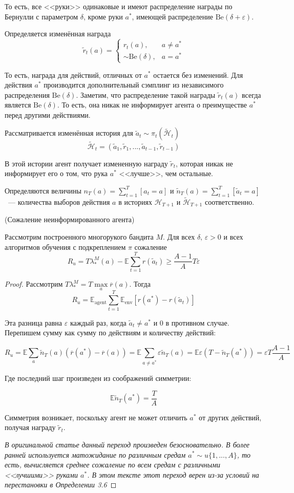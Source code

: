 \documentclass[a4paper]{article}
\newcommand{\Hh}{\mathcal{H}}
\newcommand{\E}{\mathbb{E}}
\newcommand{\Be}{\mbox{Be}}
\def\eps{\varepsilon}
\begin{document}
То есть, все <<руки>> одинаковые и имеют распределение награды по Бернулли с параметром $\delta$, кроме руки $a^*$, имеющей распределение $\Be(\delta+\eps)$.

Определяется изменённая награда
$$\tilde{r}_t(a)=\begin{cases}
r_t(a),&a\neq a^*\\
\sim \Be(\delta),&a=a^*
\end{cases}$$

То есть, награда для действий, отличных от $a^*$ остается без изменений. Для действия $a^*$ производится дополнительный сэмплинг из независимого распределения $\Be(\delta)$. Заметим, что распределение такой награды $\tilde{r}_t(a)$ всегда является $\Be(\delta)$. То есть, она никак не информирует агента о преимуществе $a^*$ перед другими действиями.

Рассматривается изменённая история для $\tilde{a}_t\sim\pi_t(\tilde{\Hh}_t)$
$$\tilde{\Hh}_t=(\tilde{a}_1,\tilde{r}_1,...,\tilde{a}_{t-1},\tilde{r}_{t-1})$$

В этой истории агент получает измененную награду $\tilde{r}_t$, которая никак не информирует его о том, что рука $a^*$ <<лучше>>, чем остальные.

Определяются величины $n_T(a)=\sum\limits_{t=1}^T[a_t=a]$ и $\tilde{n}_T(a)=\sum\limits_{t=1}^T[\tilde{a}_t=a]$~--- количества выборов действия $a$ в историях $\Hh_{T+1}$ и $\tilde{\Hh}_{T+1}$ соответственно.
\begin{lemma}{(Сожаление неинформированного агента)}

Рассмотрим построенного многорукого бандита $M$. Для всех $\delta,\,\eps>0$ и всех алгоритмов обучения с подкреплением $\pi$ сожаление
$$R_u=T\lambda_*^M(a)-\E\sum\limits_{t=1}^Tr(\tilde{a}_t)\geqslant\frac{A-1}{A}T\eps$$
\end{lemma}

\begin{proof}
	
Рассмотрим $T\lambda_*^M=T\max\limits_a\overline{r}(a)$. Тогда $$R_u=\E_{\mbox{agent}}\sum\limits_{t=1}^T \E_{\mbox{env}}[r(a^*)-r(\tilde{a}_t)]$$

Эта разница равна $\eps$ каждый раз, когда $\tilde{a}_t\neq a^*$ и $0$ в противном случае. Перепишем сумму как сумму по действиям и количеству действий:

$$R_u=\E\sum\limits_{a} \tilde{n}_T(a)(\overline{r}(a^*)-\overline{r}(a))=\E\sum\limits_{a\neq a^*}\eps \tilde{n}_T(a)=\E \eps(T-\tilde{n}_T(a^*))=\eps T\frac{A-1}{A}$$

Где последний шаг произведен из соображений симметрии:

$$\E \tilde{n}_T(a^*)=\frac{T}{A}$$

Симметрия возникает, поскольку агент не может отличить $a^*$ от других действий, получая награду $\tilde{r}_t$.

{\em В оригинальной статье \cite{lower_bounds} данный переход произведен безосновательно. В более ранней \cite{bubeck} используется матожидание по различным средам $a^*\sim u\{1,...,A\}$, то есть, вычисляется среднее сожаление по всем средам с различными <<лучшими>> руками $a^*$. В этом тексте этот переход верен из-за условий на перестановки в Определении 3.6}
\end{proof}
\end{document}
